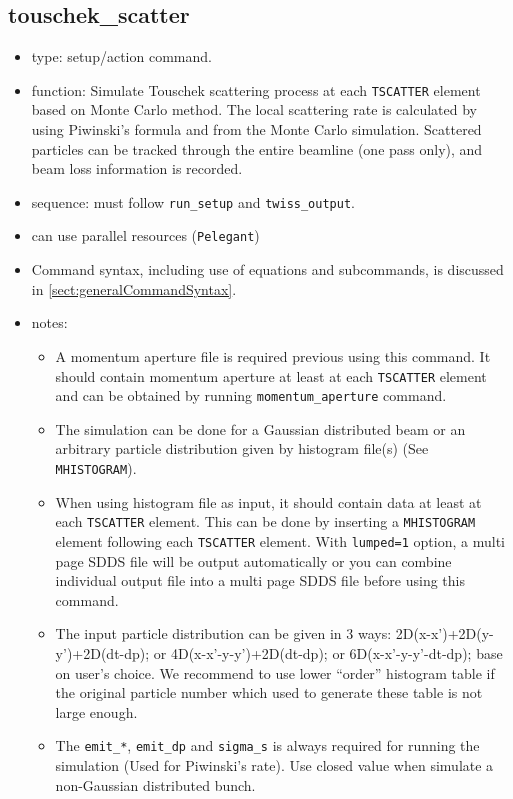 \documentclass[11pt]{article}
\begin{document}
\subsection{touschek\_scatter \label{subsec:touschekscatter}}
\begin{itemize}
\item type: setup/action command.
\item function: Simulate Touschek scattering process at each \verb|TSCATTER| element 
   based on Monte Carlo method. The local scattering rate is
   calculated by using Piwinski's formula and from the Monte Carlo
   simulation. Scattered particles can be tracked through the entire
   beamline (one pass only), and beam loss information is recorded.
\item sequence: must follow \verb|run_setup| and \verb|twiss_output|.
\item can use parallel resources (\verb|Pelegant|)
\item Command syntax, including use of equations and subcommands, is discussed in \ref{sect:generalCommandSyntax}.
\item notes: 
	\begin{itemize} 
      \item A momentum aperture file is required previous using this command. It
      should contain momentum aperture at least at each \verb|TSCATTER| element and can be
      obtained by running \verb|momentum_aperture| command. 
      \item The simulation can be done for a Gaussian distributed beam or an arbitrary 
      particle distribution given by histogram file(s) (See \verb|MHISTOGRAM|).  
      \item When using histogram file as input, it should contain data at least at each 
      \verb|TSCATTER| element. This can be done by inserting a \verb|MHISTOGRAM| element 
      following each \verb|TSCATTER| element. With \verb|lumped=1| option, a multi page 
      SDDS file will be output automatically or you can combine individual output file 
      into a multi page SDDS file before using this command.
      \item The input particle distribution can be given in 3 ways: 2D(x-x')+2D(y-y')+2D(dt-dp);
      or 4D(x-x'-y-y')+2D(dt-dp); or 6D(x-x'-y-y'-dt-dp); base on user's choice. We recommend
      to use lower ``order'' histogram table if the original particle number which used to generate
      these table is not large enough.
      \item The \verb|emit_*|, \verb|emit_dp| and \verb|sigma_s| is always required for running
      the simulation (Used for Piwinski's rate). Use closed value when simulate a non-Gaussian 
      distributed bunch. 
	\end{itemize}
\end{itemize}
\end{document}
